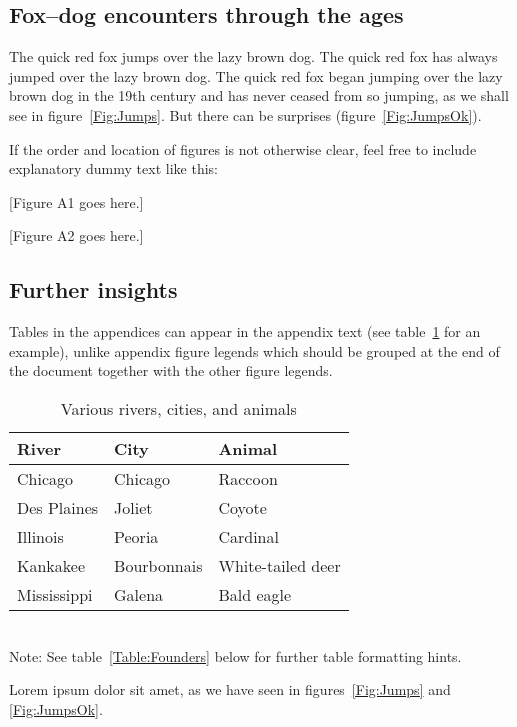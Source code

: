 \documentclass[11pt]{article}
\begin{document}
\subsection*{Fox--dog encounters through the ages}

The quick red fox jumps over the lazy brown dog. The quick red fox has always jumped over the lazy brown dog. The quick red fox began jumping over the lazy brown dog in the 19th century and has never ceased from so jumping, as we shall see in figure~\ref{Fig:Jumps}. But there can be surprises (figure~\ref{Fig:JumpsOk}).

If the order and location of figures is not otherwise clear, feel free to include explanatory dummy text like this:

[Figure A1 goes here.]

[Figure A2 goes here.]

\subsection*{Further insights}

Tables in the appendices can appear in the appendix text (see table~\ref{Table:Rivers} for an example), unlike appendix figure legends which should be grouped at the end of the document together with the other figure legends.

\begin{table}[h]
\caption{Various rivers, cities, and animals}
\label{Table:Rivers}
\centering
\begin{tabular}{lll}\hline
River        & City        & Animal            \\ \hline
Chicago      & Chicago     & Raccoon           \\
Des Plaines  & Joliet      & Coyote            \\
Illinois     & Peoria      & Cardinal          \\
Kankakee     & Bourbonnais & White-tailed deer \\
Mississippi  & Galena      & Bald eagle        \\ \hline
\end{tabular}
\bigskip{}
\\
{\footnotesize Note: See table~\ref{Table:Founders} below for further table formatting hints.}
\end{table}

Lorem ipsum dolor sit amet, as we have seen in figures~\ref{Fig:Jumps} and \ref{Fig:JumpsOk}.

\newpage{}
\renewcommand{\theequation}{B\arabic{equation}}
\renewcommand{\thetable}{B\arabic{table}}
\setcounter{equation}{0}  %
\setcounter{table}{0}
\end{document}
